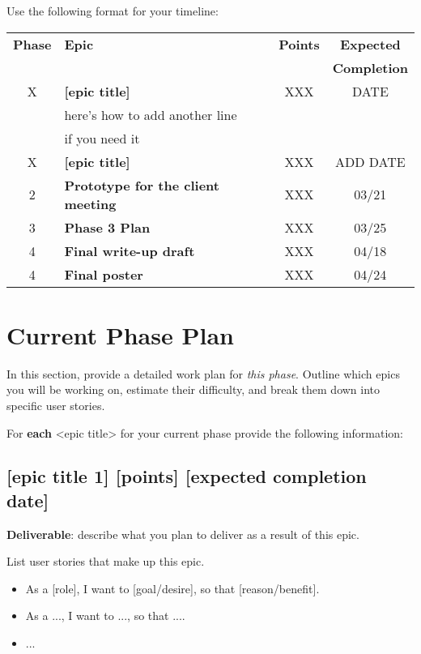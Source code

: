 \documentclass{article}
\begin{document}
Use the following format for your timeline:
%
\begin{center}
\begin{tabular}{ |c | l | c| c|} 
\hline
\textbf{Phase}& \textbf{Epic}& \textbf{Points}& \textbf{Expected}  \\ 
      & 	& 	& \textbf{Completion}  \\ 
\hline
X	& 	\textbf{[epic title]}	& XXX &	DATE\\
	& here's how to add another line	&  &	\\
	& if you need it	&  &	\\
\hline
X	&	\textbf{[epic title]} &	XXX & ADD DATE  \\
\hline
2	&	\textbf{Prototype for the client meeting} &	XXX & 03/21 \\
\hline
3	&	\textbf{Phase 3 Plan} &	XXX & 03/25 \\
\hline
4	&	\textbf{Final write-up draft} &	XXX & 04/18 \\
\hline
4	&	\textbf{Final poster} &	XXX & 04/24 \\
\hline
\end{tabular}
\end{center}


\section{Current Phase Plan}
In this section, provide a detailed work plan for \textit{this phase}.
Outline which epics you will be working on, estimate their difficulty, and break them down into specific user stories.

For \textbf{each} <epic title> for your current phase provide the following information:

\subsection{{[epic title 1]} [points] [expected completion date]} %
\textbf{Deliverable}: describe what you plan to deliver as a result of this epic.

List user stories that make up this epic.
\begin{itemize}
\item As a [role], I want to [goal/desire], so that [reason/benefit].
\item As a ..., I want to ..., so that ....
\item ...
\end{itemize}
\end{document}
